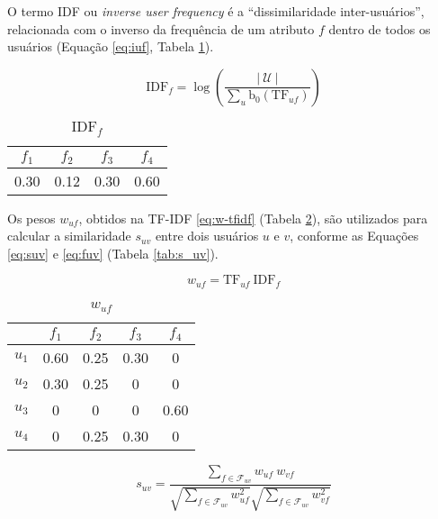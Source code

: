 O termo IDF ou \textit{inverse user frequency} é a ``dissimilaridade inter-usuários'', relacionada com o inverso da frequência de um atributo $f$ dentro de todos os usuários (Equação \ref{eq:iuf}, Tabela \ref{tab:idf_f}).

\begin{equation}
\label{eq:iuf} 
    \mathrm{IDF}_{f} = \log \left( \frac{\left|~\mathcal{U}~\right|}{\sum_{u}{\mathrm{b}_0\left(\mathrm{TF}_{uf}\right)}} \right)
\end{equation} 

\begin{table}[p]
\begin{center}
    \caption{$\mathrm{IDF}_{f}$}
    \label{tab:idf_f}
    \begin{tabular}{ | c | c | c | c | } 
    \hline
     $f_1$ & $f_2$ & $f_3$ & $f_4$   \\ \hline
     0.30 & 0.12 & 0.30 & 0.60  \\ \hline
     \end{tabular}
\end{center}
\end{table}

Os pesos $w_{uf}$, obtidos na TF-IDF \ref{eq:w-tfidf} (Tabela \ref{tab:w_uf}), são utilizados para calcular a similaridade $s_{uv}$ entre dois usuários $u$ e $v$, conforme as Equações \ref{eq:suv} e \ref{eq:fuv} (Tabela \ref{tab:s_uv}).

\begin{equation}
\label{eq:w-tfidf} 
    w_{uf} = \mathrm{TF}_{uf}~\mathrm{IDF}_{f}
\end{equation} 

\begin{table}[p]
\begin{center}
    \caption{$w_{uf}$}
    \label{tab:w_uf}
    \begin{tabular}{ | c | c | c | c | c | } 
    \hline
     & $f_1$ & $f_2$ & $f_3$ & $f_4$   \\ \hline
     $u_1$ & 0.60 & 0.25 & 0.30 & 0  \\ \hline
     $u_2$ & 0.30 & 0.25 & 0 & 0  \\ \hline
     $u_3$ & 0 & 0 & 0 & 0.60  \\ \hline
     $u_4$ & 0 & 0.25 & 0.30 & 0  \\ \hline
    \end{tabular}
\end{center}
\end{table}

\begin{equation}
\label{eq:suv}
    s_{uv} = \frac{\sum\limits_{f \in \mathcal{F}_{uv}}{w_{uf}~w_{vf}}}{\sqrt{\sum\limits_{f \in \mathcal{F}_{uv}
    }w_{uf}^2} \sqrt{\sum\limits_{f \in \mathcal{F}_{uv}}w_{vf}^2}} 
\end{equation} 

